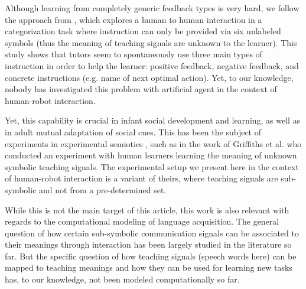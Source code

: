 Although learning from completely generic feedback types is very hard, we follow the approach from \cite{griffiths2012bottom}, which explores a human to human interaction in a categorization task where instruction can only be provided via six unlabeled symbols (thus the meaning of teaching signals are unknown to the learner). This study shows that tutors seem to spontaneously use three main types of instruction in order to help the learner: positive feedback, negative feedback, and concrete instructions (e.g. name of next optimal action). Yet, to our knowledge, nobody has investigated this problem with artificial agent in the context of human-robot interaction.

Yet, this capability is crucial in infant social development and learning, as well as in adult mutual adaptation of social cues. This has been the subject of experiments in experimental semiotics \cite{galantucci2009experimental}, such as in the work of Griffiths et al. \cite{griffiths2012bottom} who conducted an experiment with human learners learning the meaning of unknown symbolic teaching signals. The experimental setup we present here in the context of human-robot interaction is a variant of theirs, where teaching signals are sub-symbolic and not from a pre-determined set.

While this is not the main target of this article, this work is also relevant with regards to the computational modeling of language acquisition. The general question of how certain sub-symbolic communication signals can be associated to their meanings through interaction has been largely studied in the literature so far. But the specific question of how teaching signals (speech words here) can be mapped to teaching meanings and how they can be used for learning new tasks has, to our knowledge, not been modeled computationally so far. 

